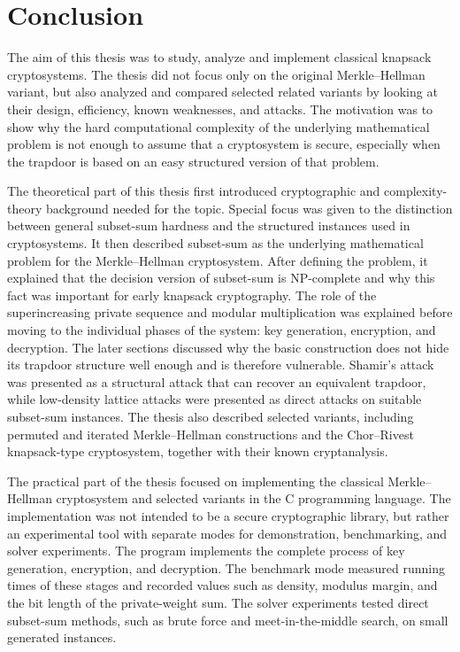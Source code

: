 \chapter*{Conclusion}

The aim of this thesis was to study, analyze and implement classical knapsack
cryptosystems. The thesis did not focus only on the original Merkle--Hellman
variant, but also analyzed and compared selected related variants by looking at
their design, efficiency, known weaknesses, and attacks. The motivation was to
show why the hard computational complexity of the underlying mathematical
problem is not enough to assume that a cryptosystem is secure, especially when
the trapdoor is based on an easy structured version of that problem.

The theoretical part of this thesis first introduced cryptographic and
complexity-theory background needed for the topic. Special focus was given to
the distinction between general subset-sum hardness and the structured
instances used in cryptosystems. It then described subset-sum as the underlying
mathematical problem for the Merkle--Hellman cryptosystem. After defining the
problem, it explained that the decision version of subset-sum is NP-complete
and why this fact was important for early knapsack cryptography. The role of
the superincreasing private sequence and modular multiplication was explained
before moving to the individual phases of the system: key generation,
encryption, and decryption. The later sections discussed why the basic
construction does not hide its trapdoor structure well enough and is therefore
vulnerable. Shamir's attack was presented as a structural attack that can
recover an equivalent trapdoor, while low-density lattice attacks were
presented as direct attacks on suitable subset-sum instances. The thesis also
described selected variants, including permuted and iterated Merkle--Hellman
constructions and the Chor--Rivest knapsack-type cryptosystem, together with
their known cryptanalysis.

The practical part of the thesis focused on implementing the classical
Merkle--Hellman cryptosystem and selected variants in the C programming
language. The implementation was not intended to be a secure cryptographic
library, but rather an experimental tool with separate modes for demonstration,
benchmarking, and solver experiments. The program implements the complete
process of key generation, encryption, and decryption. The benchmark mode
measured running times of these stages and recorded values such as density,
modulus margin, and the bit length of the private-weight sum. The solver
experiments tested direct subset-sum methods, such as brute force and
meet-in-the-middle search, on small generated instances. 

